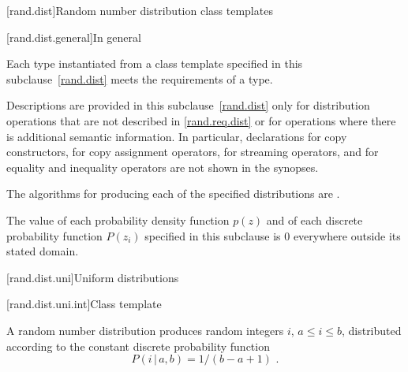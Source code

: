 [rand.dist]{Random number distribution class templates}%

[rand.dist.general]{In general}

\pnum
Each type instantiated
from a class template specified in this subclause~\ref{rand.dist}
meets the requirements
of a  type.

\pnum
Descriptions are provided in this subclause~\ref{rand.dist}
only for distribution operations
that are not described in \ref{rand.req.dist}
or for operations where there is additional semantic information.
In particular,
declarations for copy constructors,
for copy assignment operators,
for streaming operators,
and for equality and inequality operators
are not shown in the synopses.

\pnum
The algorithms for producing each
of the specified distributions are
.

\pnum
The value of each probability density function $p(z)$
and of each discrete probability function $P(z_i)$
specified in this subclause
is $0$
everywhere outside its stated domain.


[rand.dist.uni]{Uniform distributions}%
%


[rand.dist.uni.int]{Class template }%
%

\pnum
A  random number distribution
produces random integers $i$,
$a \leq i \leq b$,
distributed according to
the constant discrete probability function%
\[  P(i\,|\,a,b) = 1 / (b - a + 1) \text{ .} \]

